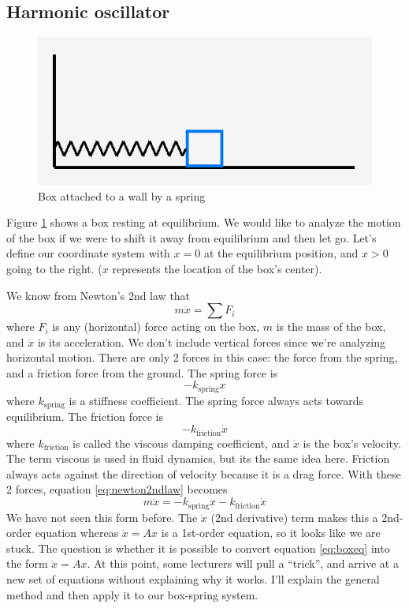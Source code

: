 \documentclass[11pt, oneside]{article}   	%
\begin{document}
\subsection*{Harmonic oscillator}

\begin{figure}[h]
\centering
\includegraphics[scale=0.5]{boxspring}
\caption{Box attached to a wall by a spring}
\label{fig:BoxSpring}
\end{figure}

Figure \ref{fig:BoxSpring} shows a box resting at equilibrium.
We would like to analyze the motion of the box if we were to shift it away from equilibrium and then let go.
Let's define our coordinate system with $x = 0$ at the equilibrium position, and $x > 0$ going to the right.
($x$ represents the location of the box's center).

We know from Newton's 2nd law that
\begin{equation} \label{eq:newton2ndlaw}
m \ddot{x} = \sum F_i
\end{equation}
where $F_i$ is any (horizontal) force acting on the box, $m$ is the mass of the box, and $\ddot{x}$ is its acceleration.
We don't include vertical forces since we're analyzing horizontal motion.
There are only 2 forces in this case: the force from the spring, and a friction force from the ground.
The spring force is
\begin{equation}
  -k_\mathrm{spring} x
\end{equation}
where $k_\mathrm{spring}$ is a stiffness coefficient.
The spring force always acts towards equilibrium.
The friction force is
\begin{equation}
  -k_\mathrm{friction} \dot{x}
\end{equation}
where $k_\mathrm{friction}$ is called the viscous damping coefficient, and $\dot{x}$ is the box's velocity.
The term viscous is used in fluid dynamics, but its the same idea here.
Friction always acts against the direction of velocity because it is a drag force.
With these 2 forces, equation \ref*{eq:newton2ndlaw} becomes
\begin{equation} \label{eq:boxeq}
  m \ddot{x} =
  -k_\mathrm{spring} x
  -k_\mathrm{friction} \dot{x}
\end{equation}
We have not seen this form before.
The $\ddot{x}$ (2nd derivative) term makes this a 2nd-order equation whereas $\dot{x} = Ax$ is a 1st-order equation, so it looks like we are stuck.
The question is whether it is possible to convert equation \ref*{eq:boxeq} into the form $\dot{x} = Ax$.
At this point, some lecturers will pull a ``trick'', and arrive at a new set of equations without explaining why it works.
I'll explain the general method and then apply it to our box-spring system.
\end{document}
